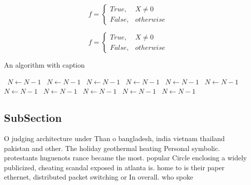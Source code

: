 \documentclass[a4paper]{article}
\begin{document}
\begin{equation}   f =
\begin{cases} True, & X \neq 0\\
False, & otherwise
\end{cases}
\end{equation}

\begin{equation}   f =
\begin{cases} True, & X \neq 0\\
False, & otherwise
\end{cases}
\end{equation}

\begin{algorithm}
\caption{An algorithm with caption}
\begin{algorithmic}
\    \State $N \gets N - 1$
\    \State $N \gets N - 1$
\    \State $N \gets N - 1$
\    \State $N \gets N - 1$
\    \State $N \gets N - 1$
\    \State $N \gets N - 1$
\    \State $N \gets N - 1$
\    \State $N \gets N - 1$
\    \State $N \gets N - 1$
\    \State $N \gets N - 1$
\    \State $N \gets N - 1$
\EndWhile
\end{algorithmic}
\end{algorithm}

\subsection{SubSection}

O judging architecture under Than o bangladesh, india vietnam thailand pakistan and other. The holiday geothermal heating Personal symbolic. protestants huguenots rance became the most. popular Circle enclosing a widely publicized, cheating scandal exposed in atlanta is. home to is their paper ethernet, distributed packet switching or In overall. who spoke 
\end{document}
